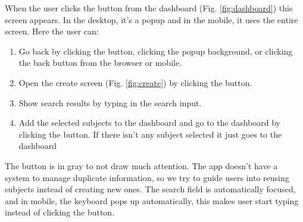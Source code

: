 When the user clicks the  button from the dashboard (Fig. \ref{fig:dashboard}) this screen appears. In the desktop, it's a popup and in the mobile, it uses the entire screen. Here the user can:
\begin{enumerate}[itemsep=0mm]
    \item Go back by clicking the  button, clicking the popup background, or clicking the back button from the browser or mobile.
    \item Open the create screen (Fig.  \ref{fig:create}) by clicking the  button.
    \item Show search results by typing in the search input.
    \item Add the selected subjects to the dashboard and go to the dashboard by clicking the  button. If there isn't any subject selected it just goes to the dashboard
\end{enumerate}

The  button is in gray to not draw much attention. The app doesn't have a system to manage duplicate information, so we try to guide users into reusing subjects instead of creating new ones. The search field is automatically focused, and in mobile, the keyboard pops up automatically, this makes user start typing instead of clicking the  button.

